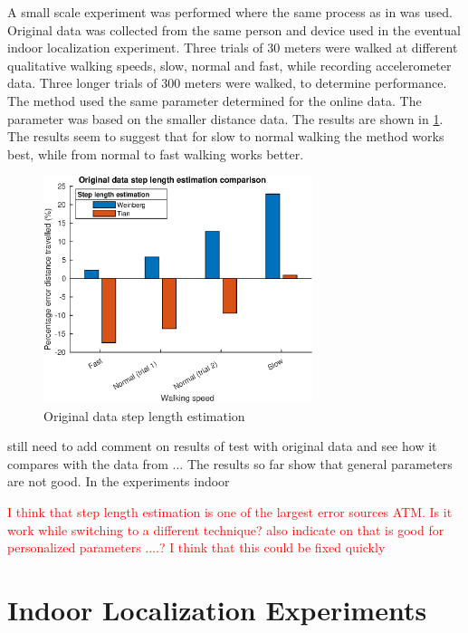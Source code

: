A small scale experiment was performed where the same process as in \cite{Vezocnik2019} was used. Original data was collected from the same person and device used in the eventual indoor localization experiment. Three trials of 30 meters were walked at different qualitative walking speeds, slow, normal and fast, while recording accelerometer data. Three longer trials of 300 meters were walked, to determine performance. The \citet{Tian2016} method used the same parameter determined for the online data. The \citet{Weinberg2002} parameter was based on the smaller distance data. The results are shown in \cref{fig:step_length_personal_testing}. The results seem to suggest that for slow to normal walking the \citet{Tian2016} method works best, while from normal to fast walking \citet{Weinberg2002} works better. 
\begin{figure}[H]
	\centering
	\includegraphics[width=0.7\textwidth]{images/20201113_1920_wienberg_vs_tian_og_data_1}
	\caption{Original data step length estimation \\ }
	\label{fig:step_length_personal_testing}
\end{figure}

{\color{cyan} still need to add comment on results of test with original data and see how it compares with the data from \cite{Vezocnik2019}... The results so far show that general parameters are not good. In the experiments indoor }

\textcolor{red}{I think that step length estimation is one of the largest error sources ATM. Is it work while switching to a different technique? \citet{Vezocnik2019} also indicate on that is good for personalized parameters ....? I think that this could be fixed quickly}

\section{Indoor Localization Experiments}

